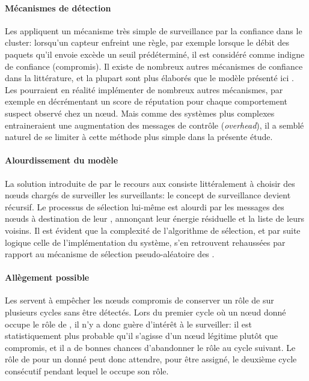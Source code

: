 \paragraph{Mécanismes de détection}
Les \cns appliquent un mécanisme très simple de surveillance par la confiance dans le cluster: lorsqu'un capteur enfreint une règle, par exemple lorsque le débit des paquets qu'il envoie excède un seuil prédéterminé, il est considéré comme indigne de confiance (compromis).
Il existe de nombreux autres mécanismes de confiance dans la littérature, et la plupart sont plus élaborés que le modèle présenté ici .
Les \cns pourraient en réalité implémenter de nombreux autres mécanismes, par exemple en décrémentant un score de réputation pour chaque comportement suspect observé chez un nœud.
Mais comme des systèmes plus complexes entraineraient une augmentation des messages de contrôle (\textit{overhead}), il a semblé naturel de se limiter à cette méthode plus simple dans la présente étude.

\paragraph{Alourdissement du modèle}
La solution introduite de par le recours aux \vns consiste littéralement à choisir des nœuds chargés de surveiller les surveillants: le concept de surveillance devient récursif.
Le processus de sélection lui-même est alourdi par les messages des nœuds à destination de leur \ch, annonçant leur énergie résiduelle et la liste de leurs voisins.
Il est évident que la complexité de l'algorithme de sélection, et par suite logique celle de l'implémentation du système, s'en retrouvent rehaussées par rapport au mécanisme de sélection pseudo-aléatoire des \cns.

\paragraph{Allègement possible}
Les \vns servent à empêcher les nœuds compromis de conserver un rôle de \cn sur plusieurs cycles sans être détectés.
Lors du premier cycle où un nœud donné occupe le rôle de \cn, il n'y a donc guère d'intérêt à le surveiller: il est statistiquement plus probable qu'il s'agisse d'un nœud légitime plutôt que compromis, et il a de bonnes chances d'abandonner le rôle au cycle suivant.
Le rôle de \vn pour un \cn donné peut donc attendre, pour être assigné, le deuxième cycle consécutif pendant lequel le \cn occupe son rôle.

